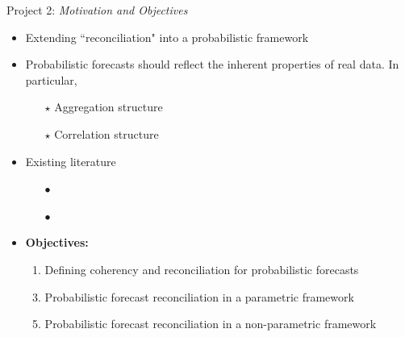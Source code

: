 \documentclass[11pt,xcolor=dvipsnames,handout]{beamer} %
\begin{document}
\begin{frame}[noframenumbering]{Project 2: \textit{Motivation and Objectives}}
\begin{itemize}[<+-| alert@+>]
			\item Extending ``reconciliation" into a probabilistic framework
			\item[]
			\item Probabilistic forecasts should reflect the inherent properties of real data. In particular, 
			\begin{itemize}[<+-| alert@+>]
				\item[$\star$] Aggregation structure
				\item[$\star$] Correlation structure
			\end{itemize}
			\item Existing literature
				\begin{itemize}[<+-| alert@+>]
					\item[$\bullet$] \citep{BenTaieb2017}
					\item[$\bullet$] \citep{Jeon2018}
			\end{itemize}
			\item[]
				
	\item \textbf{\color{Maroon}Objectives:} 
	\begin{enumerate}
		\item Defining coherency and reconciliation for probabilistic forecasts
		\item[]
		\item Probabilistic forecast reconciliation in a parametric framework
		\item[]
		\item Probabilistic forecast reconciliation in a non-parametric framework
	\end{enumerate}	
	\item[]
	
\end{itemize}    
\end{frame}


%	
\end{document}

